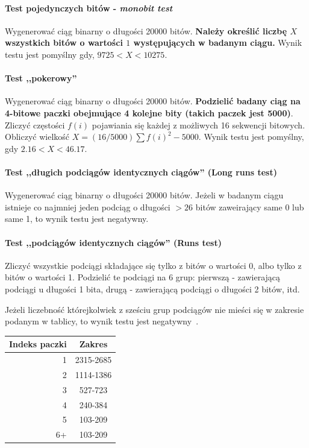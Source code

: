 \documentclass[wi]{zut}
\begin{document}
\paragraph{Test pojedynczych bitów - \emph{monobit test}}

Wygenerować ciąg binarny o długości 20000 bitów. \textbf{Należy określić liczbę $X$ wszystkich bitów o wartości $1$ występujących w badanym ciągu.} Wynik testu jest pomyślny gdy, $9725 < X < 10275$.

\paragraph{Test ,,pokerowy''}

Wygenerować ciąg binarny o długości 20000 bitów. \textbf{Podzielić badany ciąg na 4-bitowe paczki obejmujące 4 kolejne bity (takich paczek jest 5000)}. Zliczyć częstości $f(i)$ pojawiania się każdej z możliwych 16 sekwencji bitowych. Obliczyć wielkość $X = (16/5000) \sum{f(i)^2} - 5000$. Wynik testu jest pomyślny, gdy $2.16 < X < 46.17$.

\paragraph{Test ,,długich podciągów identycznych ciągów'' (Long runs test)}

Wygenerować ciąg binarny o długości 20000 bitów.  Jeżeli w badanym ciągu istnieje co najmniej jeden podciąg o długości $>26$ bitów zaweirający same 0 lub same 1, to wynik testu jest negatywny.

\paragraph{Test ,,podciągów identycznych ciągów'' (Runs test)}

Zliczyć wszystkie podciągi składające się tylko z bitów o wartości 0, albo tylko z bitów o wartości 1. Podzielić te podciągi na 6 grup: pierwszą - zawierającą podciągi u długości 1 bita, drugą - zawierającą podciągi o długości 2 bitów, itd.

Jeżeli liczebność którejkolwiek z sześciu grup podciągów nie mieści się w zakresie podanym w tablicy, to wynik testu jest negatywny~\cite{Chocian2020_2}.

\begin{table}[H]
\centering
\begin{tabular}{@{}rc@{}}
\toprule
Indeks paczki & Zakres    \\ \midrule
1             & 2315-2685 \\
2             & 1114-1386 \\
3             & 527-723   \\
4             & 240-384   \\
5             & 103-209   \\
6+            & 103-209   \\ \bottomrule
\end{tabular}
\end{table}
\end{document}
